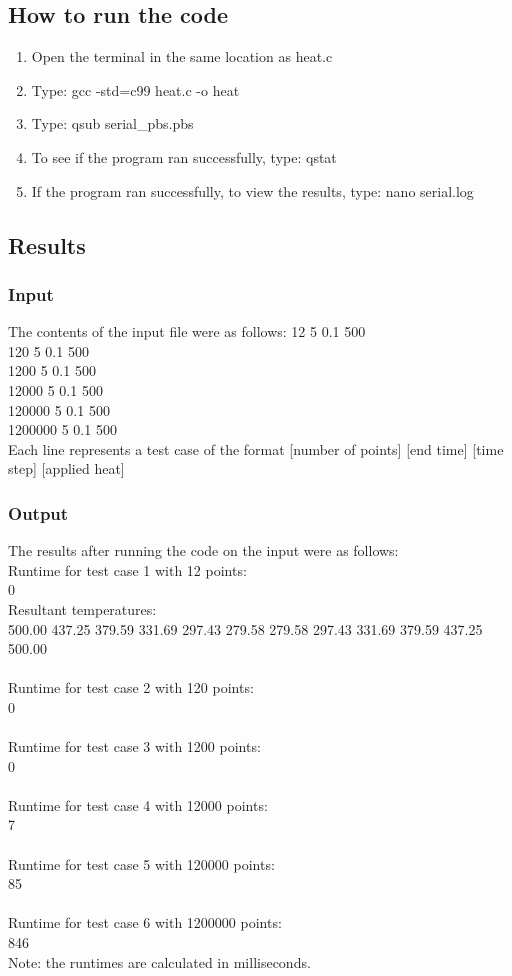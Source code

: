 \documentclass{article}
\begin{document}
\subsection{How to run the code}
\begin{enumerate}
	\item Open the terminal in the same location as heat.c
	\item Type: gcc -std=c99 heat.c -o heat
	\item Type: qsub serial\_pbs.pbs
	\item To see if the program ran successfully, type: qstat
	\item If the program ran successfully, to view the results, type: nano serial.log
\end{enumerate}

\subsection{Results}
\subsubsection{Input}
The contents of the input file were as follows:
12 5 0.1 500\\
120 5 0.1 500\\
1200 5 0.1 500\\
12000 5 0.1 500\\
120000 5 0.1 500\\
1200000 5 0.1 500\\
Each line represents a test case of the format [number of points] [end time] [time step] [applied heat]

\subsubsection{Output}
The results after running the code on the input were as follows:\\
Runtime for test case 1 with 12 points:\\
0\\
Resultant temperatures:\\
500.00 437.25 379.59 331.69 297.43 279.58 279.58 297.43 331.69 379.59 437.25 500.00\\
\\
Runtime for test case 2 with 120 points:\\
0\\
\\
Runtime for test case 3 with 1200 points:\\
0\\
\\
Runtime for test case 4 with 12000 points:\\
7\\
\\
Runtime for test case 5 with 120000 points:\\
85\\
\\
Runtime for test case 6 with 1200000 points:\\
846\\
Note: the runtimes are calculated in milliseconds.
\end{document}
